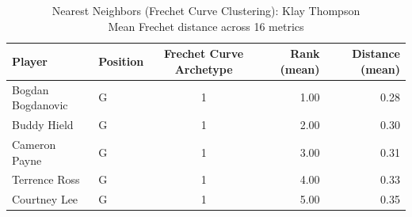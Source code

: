 \begin{table}[t]
\caption*{
{\fontsize{20}{25} Nearest Neighbors (Frechet Curve Clustering): Klay Thompson\fontsize{12}{15}\selectfont } \\ 
{\fontsize{14}{17}\selectfont  Mean Frechet distance across 16 metrics\fontsize{12}{15}\selectfont }
} 
\fontsize{12.0pt}{14.0pt}\selectfont
\begin{tabular*}{\linewidth}{@{\extracolsep{\fill}}llcrr}
\toprule
Player & Position & Frechet Curve Archetype & Rank (mean) & Distance (mean) \\ 
\midrule\addlinespace[2.5pt]
Bogdan Bogdanovic & G & 1 & 1.00 & 0.28 \\ 
Buddy Hield & G & 1 & 2.00 & 0.30 \\ 
Cameron Payne & G & 1 & 3.00 & 0.31 \\ 
Terrence Ross & G & 1 & 4.00 & 0.33 \\ 
Courtney Lee & G & 1 & 5.00 & 0.35 \\ 
\bottomrule
\end{tabular*}
\end{table}

